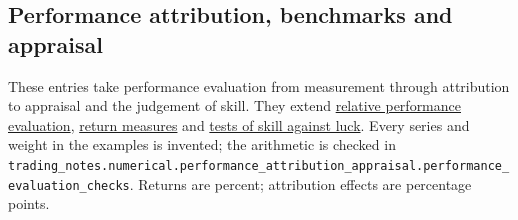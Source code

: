 \subsection{Performance attribution, benchmarks and appraisal}

These entries take performance evaluation from measurement through attribution to appraisal and the judgement of skill. They extend \hyperref[meth:relative-performance-evaluation]{relative performance evaluation}, \hyperref[def:return-measures]{return measures} and \hyperref[meth:skill-luck-significance-tests]{tests of skill against luck}. Every series and weight in the examples is invented; the arithmetic is checked in \nolinkurl{trading_notes.numerical.performance_attribution_appraisal.performance_evaluation_checks}. Returns are percent; attribution effects are percentage points.

